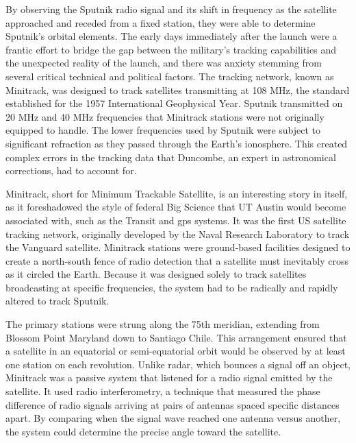By observing the Sputnik radio signal and its shift in frequency as the satellite approached and receded from a fixed station, they were able to determine Sputnik’s orbital elements. The early days immediately after the launch were a frantic effort to bridge the gap between the military's tracking capabilities and the unexpected reality of the launch, and there was anxiety stemming from several critical technical and political factors. The tracking network, known as Minitrack, was designed to track satellites transmitting at 108 MHz, the standard established for the 1957 International Geophysical Year. Sputnik transmitted on 20 MHz and 40 MHz frequencies that Minitrack stations were not originally equipped to handle. The lower frequencies used by Sputnik were subject to significant refraction as they passed through the Earth's ionosphere. This created complex errors in the tracking data that Duncombe, an expert in astronomical corrections, had to account for. 

Minitrack, short for Minimum Trackable Satellite, is an interesting story in itself, as it foreshadowed the style of federal Big Science that UT Austin would become associated with, such as the Transit and gps systems. It was the first US satellite tracking network, originally developed by the Naval Research Laboratory to track the Vanguard satellite. Minitrack stations were ground-based facilities designed to create a north-south fence of radio detection that a satellite must inevitably cross as it circled the Earth. Because it was designed solely to track satellites broadcasting at specific frequencies, the system had to be radically and rapidly altered to track Sputnik. 

The primary stations were strung along the 75th meridian, extending from Blossom Point Maryland down to Santiago Chile. This arrangement ensured that a satellite in an equatorial or semi-equatorial orbit would be observed by at least one station on each revolution. Unlike radar, which bounces a signal off an object, Minitrack was a passive system that listened for a radio signal emitted by the satellite. It used radio interferometry, a technique that measured the phase difference of radio signals arriving at pairs of antennas spaced specific distances apart. By comparing when the signal wave reached one antenna versus another, the system could determine the precise angle toward the satellite.
 
